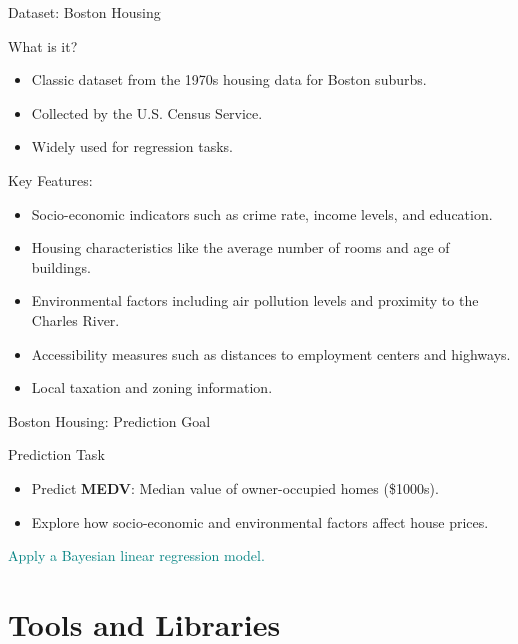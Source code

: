 \documentclass{beamer}
\begin{document}
\begin{frame}{Dataset: Boston Housing}
  \begin{block}{What is it?}
    \begin{itemize}
      \item Classic dataset from the 1970s housing data for Boston suburbs.
      \item Collected by the U.S. Census Service.
      \item Widely used for regression tasks.
    \end{itemize}
  \end{block}
  Key Features:
    \begin{itemize}
      \item Socio-economic indicators such as crime rate, income levels, and education.
      \item Housing characteristics like the average number of rooms and age of buildings.
      \item Environmental factors including air pollution levels and proximity to the Charles River.
      \item Accessibility measures such as distances to employment centers and highways.
      \item Local taxation and zoning information.
    \end{itemize}
\end{frame}

\begin{frame}{Boston Housing: Prediction Goal}
  \begin{block}{Prediction Task}
    \begin{itemize}
      \item Predict \textbf{MEDV}: Median value of owner-occupied homes (\$1000s).
      \item Explore how socio-economic and environmental factors affect house prices.
    \end{itemize}
  \end{block}
  \vfill
  \centering
  \textcolor{teal}{\large Apply a Bayesian linear regression model.}
\end{frame}

\section{Tools and Libraries}
\end{document}
